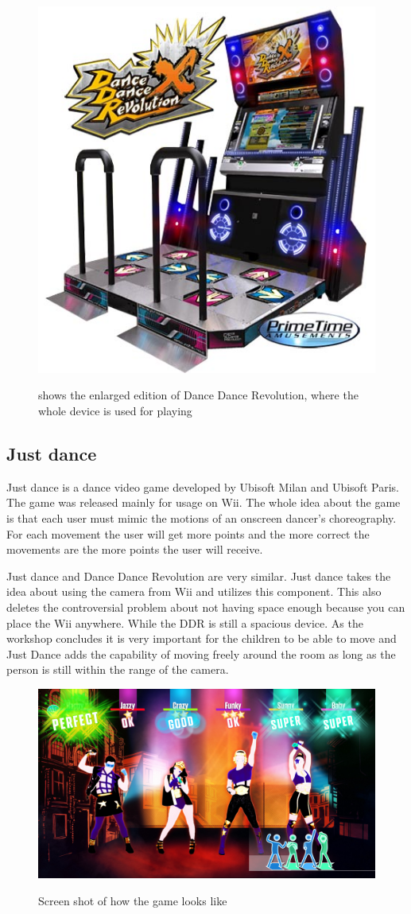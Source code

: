 \begin{figure}[H]
	\centering
	\includegraphics[width=0.7\linewidth]{figure/Analysis/dancedance}
	\label{fig:dancedance}
	\caption{shows the enlarged edition of Dance Dance Revolution, where the whole device is used for playing \cite{DanceDanceRevolution}}
\end{figure}

\subsection{Just dance}
Just dance is a dance video game developed by Ubisoft Milan and Ubisoft Paris. The game was released mainly for usage on Wii. The whole idea about the game is that each user must mimic the motions of an onscreen dancer’s choreography. For each movement the user will get more points and the more correct the movements are the more points the user will receive.

Just dance and Dance Dance Revolution are very similar. Just dance takes the idea about using the camera from Wii and utilizes this component. This also deletes the controversial problem about not having space enough because you can place the Wii anywhere. While the DDR is still a spacious device. As the workshop concludes it is very important for the children to be able to move and Just Dance adds the capability of moving freely around the room as long as the person is still within the range of the camera. \cite{JustDancenow}
\begin{figure}[H]
	\centering
	\includegraphics[width=0.7\linewidth]{figure/Analysis/justdance}
	\label{fig:Just Dance}
	\caption{Screen shot of how the game looks like \cite{JustDancenow}}
\end{figure}

